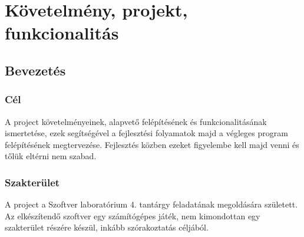 %
\chapter{Követelmény, projekt, funkcionalitás}

\thispagestyle{fancy}

\section{Bevezetés}

\subsection{Cél}

A project követelményeinek, alapvető felépítésének és funkcionalitásának ismertetése, ezek segítségével a fejlesztési folyamatok majd a végleges program felépítésének megtervezése. Fejlesztés közben ezeket figyelembe kell majd venni és tőlük eltérni nem szabad.

\subsection{Szakterület}
A project a Szoftver laboratórium 4. tantárgy feladatának megoldására született. Az elkészítendő szoftver egy számítógépes játék, nem kimondottan egy szakterület részére készül, inkább szórakoztatás céljából.


